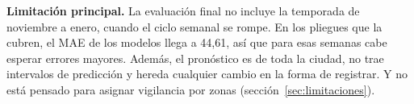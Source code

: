 \textbf{Limitación principal.} La evaluación final no incluye la temporada de noviembre a enero, cuando el ciclo semanal se rompe. En los pliegues que la cubren, el MAE de los modelos llega a 44,61, así que para esas semanas cabe esperar errores mayores. Además, el pronóstico es de toda la ciudad, no trae intervalos de predicción y hereda cualquier cambio en la forma de registrar. Y no está pensado para asignar vigilancia por zonas (sección~\ref{sec:limitaciones}).
